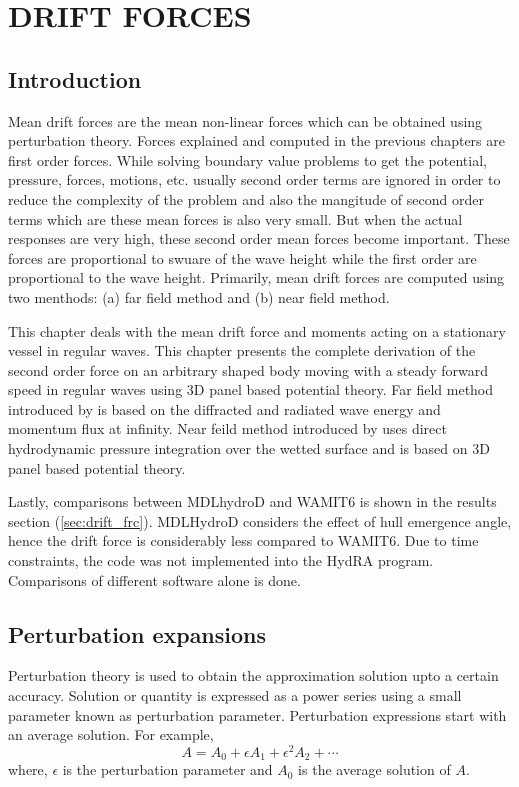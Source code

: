 \chapter{DRIFT FORCES}
\section{Introduction}
Mean drift forces are the mean non-linear forces which can be obtained using perturbation theory. 
Forces explained and computed in the previous chapters
are first order forces. While solving boundary value problems to get the potential, pressure, forces, 
motions, etc. usually
second order terms are ignored in order to reduce the complexity of the problem and also the mangitude of
second order terms which are these mean forces is also very small. But when the actual responses are very high,
these second order mean forces become important. These forces are proportional to swuare of the wave height 
while the 
first order are proportional to the wave height. Primarily, mean drift forces are computed using two menthods:
(a) far field method and (b) near field method.

This chapter deals with the mean drift force and moments acting on a stationary vessel in regular waves. This chapter
presents the complete derivation of the second order force on an arbitrary shaped body moving with a steady 
forward speed in regular waves using 3D panel based potential theory. Far field method introduced by
\cite{maruo1957excess} is based on the diffracted and radiated wave energy and momentum flux at infinity. Near feild
method introduced by \cite{boese1970einfache} uses direct hydrodynamic pressure integration over the wetted surface and 
is based on 3D panel based potential theory.

Lastly, comparisons between MDLhydroD and WAMIT6 is shown in the results section (\ref{sec:drift_frc}).
MDLHydroD considers the effect of hull emergence angle, hence the drift force is considerably
less compared to WAMIT6. Due to time constraints, the code was not implemented into the HydRA
program. Comparisons of different software alone is done.

\section{Perturbation expansions}
\label{sec:perturbation_exp}
Perturbation theory is used to obtain the approximation solution upto a certain accuracy. Solution or quantity is 
expressed as a power series using a small parameter known as perturbation parameter. Perturbation expressions
start with an average solution.
For example, 
\begin{equation}
    A = A_0 + \epsilon A_1 + \epsilon^2 A_2 + \cdots
\end{equation}
where, $\epsilon$ is the perturbation parameter and $A_0$ is the average solution of $A$.

